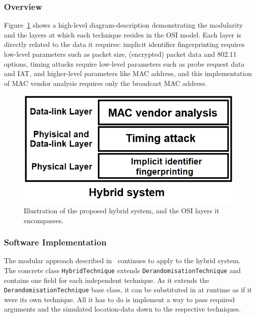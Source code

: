 \subsubsection{Overview}

Figure~\ref{fig:solutionstack} shows a high-level diagram-description demonstrating the modularity and the layers at which each technique resides in the OSI model.
Each layer is directly related to the data it requires: implicit identifier fingerprinting requires low-level parameters such as packet size, (encrypted) packet data and 802.11 options, timing attacks require low-level parameters such as probe request data and IAT, and higher-level parameters like MAC address, and this implementation of MAC vendor analysis requires only the broadcast MAC address.

\begin{figure}[!ht]
    \centering
    \includegraphics[scale=0.25]{figures/solutionstack.png}
    \caption{Illustration of the proposed hybrid system, and the OSI layers it encompasses.}
    \label{fig:solutionstack}
\end{figure}

\subsubsection{Software Implementation}

The modular approach described in~ continues to apply to the hybrid system.
The concrete class \texttt{HybridTechnique} extends \texttt{DerandomisationTechnique} and contains one field for each independent technique.
As it extends the \texttt{DerandomisationTechnique} base class, it can be substituted in at runtime as if it were its own technique.
All it has to do is implement a way to pass required arguments and the simulated location-data down to the respective techniques.
